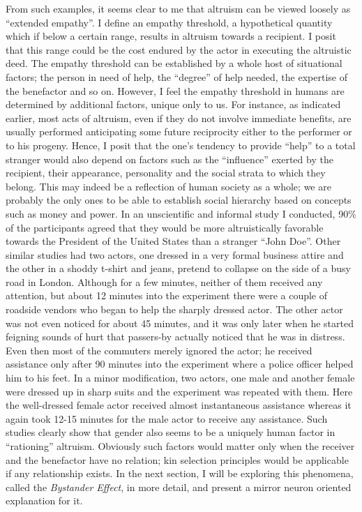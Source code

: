 \documentclass[12pt, letter]{article}
\begin{document}
From such examples, it seems clear to me that altruism can be viewed loosely as ``extended empathy''. I define an empathy threshold, a hypothetical quantity which if below a certain range, results in altruism towards a recipient. I posit that this range could be the cost endured by the actor in executing the altruistic deed. The empathy threshold can be established by a whole host of situational factors; the person in need of help, the ``degree'' of help needed, the expertise of the benefactor and so on. However, I feel the empathy threshold in humans are determined by additional factors, unique only to us. For instance, as indicated earlier, most acts of altruism, even if they do not involve immediate benefits, are usually performed anticipating some future reciprocity either to the performer or to his progeny. Hence, I posit that the one's tendency to provide ``help'' to a total stranger would also depend on factors such as the ``influence'' exerted by the recipient, their appearance, personality and the social strata to which they belong. This may indeed be a reflection of human society as a whole; we are probably the only ones to be able to establish social hierarchy based on concepts such as money and power. In an unscientific and informal study I conducted, 90\% of the participants agreed that they would be more altruistically favorable towards the President of the United States than a stranger ``John Doe''. Other similar studies had two actors, one dressed in a very formal business attire and the other in a shoddy t-shirt and jeans, pretend to collapse on the side of a busy road in London. Although for a few minutes, neither of them received any attention, but about 12 minutes into the experiment there were a couple of roadside vendors who began to help the sharply dressed actor. The other actor was not even noticed for about 45 minutes, and it was only later when he started feigning sounds of hurt that passers-by  actually noticed that he was in distress. Even then most of the commuters merely ignored the actor; he received assistance only after 90 minutes into the experiment where a police officer helped him to his feet. In a minor modification, two actors, one male and another female were dressed up in sharp suits and the experiment was repeated with them. Here the well-dressed female actor received almost instantaneous assistance whereas it again took 12-15 minutes for the male actor to receive any assistance. Such studies clearly show that gender also seems to be a uniquely human factor in ``rationing'' altruism. Obviously such factors would matter only when the receiver and the benefactor have no relation; kin selection principles would be applicable if any relationship exists. In the next section, I will be exploring this phenomena, called the \emph{Bystander Effect}, in more detail, and present a mirror neuron oriented explanation for it.
\end{document}
